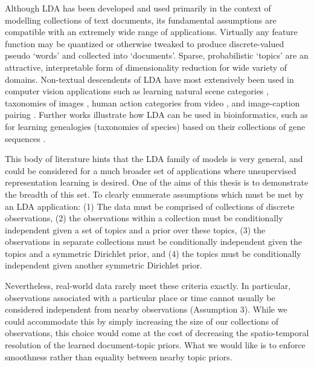 Although LDA has been developed and used primarily in the context of modelling collections of text documents, its fundamental assumptions are compatible with an extremely wide range of applications. Virtually any feature function may be quantized or otherwise tweaked to produce discrete-valued pseudo `words' and collected into `documents'. Sparse, probabilistic `topics' are an attractive, interpretable form of dimensionality reduction for wide variety of domains. Non-textual descendents of LDA have most extensively been used in computer vision applications such as learning natural scene categories \citep{FeiFei2005}, taxonomies of images \citep{bart2011}, human action categories from video \citep{Niebles2008}, and image-caption pairing \citep{Blei2003Captions}. Further works illustrate how LDA can be used in bioinformatics, such as for learning genealogies (taxonomies of species) based on their collections of gene sequences \citep{Pritchard2000}. 

This body of literature hints that the LDA family of models is very general, and could be considered for a much broader set of applications where unsupervised representation learning is desired. One of the aims of this thesis is to demonstrate the breadth of this set. To clearly enumerate assumptions which must be met by an LDA application: (1) The data must be comprised of collections of discrete observations, (2) the observations within a collection must be conditionally independent given a set of topics and a prior over these topics, (3) the observations in separate collections must be conditionally independent given the topics and a symmetric Dirichlet prior, and (4) the topics must be conditionally independent given another symmetric Dirichlet prior.

Nevertheless, real-world data rarely meet these criteria exactly. In particular, observations associated with a particular place or time cannot usually be considered independent from nearby observations (Assumption 3). While we could accommodate this by simply increasing the size of our collections of observations, this choice would come at the cost of decreasing the spatio-temporal resolution of the learned document-topic priors. What we would like is to enforce smoothness rather than equality between nearby topic priors.

